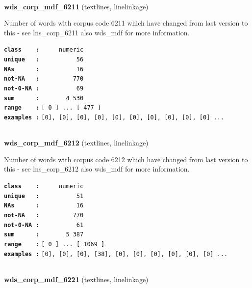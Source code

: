 \documentclass[]{article}
\begin{document}
~

\textbf{wds\_corp\_mdf\_6211} (textlines, linelinkage)

Number of words with corpus code 6211 which have changed from last
version to this - see lns\_corp\_6211 also wds\_mdf for more
information.

\textbf{\texttt{class\ \ \ \ :}} \texttt{~~~~~numeric}\\
\textbf{\texttt{unique\ \ \ :}} \texttt{~~~~~~~~~~56}\\
\textbf{\texttt{NAs\ \ \ \ \ \ :}} \texttt{~~~~~~~~~~16}\\
\textbf{\texttt{not-NA\ \ \ :}} \texttt{~~~~~~~~~770}\\
\textbf{\texttt{not-0-NA\ :}} \texttt{~~~~~~~~~~69}\\
\textbf{\texttt{sum\ \ \ \ \ \ :}} \texttt{~~~~~~~4~530}\\
\textbf{\texttt{range\ \ \ \ :}}
\texttt{{[}\ 0\ {]}\ ...\ {[}\ 477\ {]}}\\
\textbf{\texttt{examples\ :}}
\texttt{{[}0{]},\ {[}0{]},\ {[}0{]},\ {[}0{]},\ {[}0{]},\ {[}0{]},\ {[}0{]},\ {[}0{]},\ {[}0{]},\ {[}0{]}\ ...}\\

~

\textbf{wds\_corp\_mdf\_6212} (textlines, linelinkage)

Number of words with corpus code 6212 which have changed from last
version to this - see lns\_corp\_6212 also wds\_mdf for more
information.

\textbf{\texttt{class\ \ \ \ :}} \texttt{~~~~~numeric}\\
\textbf{\texttt{unique\ \ \ :}} \texttt{~~~~~~~~~~51}\\
\textbf{\texttt{NAs\ \ \ \ \ \ :}} \texttt{~~~~~~~~~~16}\\
\textbf{\texttt{not-NA\ \ \ :}} \texttt{~~~~~~~~~770}\\
\textbf{\texttt{not-0-NA\ :}} \texttt{~~~~~~~~~~61}\\
\textbf{\texttt{sum\ \ \ \ \ \ :}} \texttt{~~~~~~~5~387}\\
\textbf{\texttt{range\ \ \ \ :}}
\texttt{{[}\ 0\ {]}\ ...\ {[}\ 1069\ {]}}\\
\textbf{\texttt{examples\ :}}
\texttt{{[}0{]},\ {[}0{]},\ {[}0{]},\ {[}38{]},\ {[}0{]},\ {[}0{]},\ {[}0{]},\ {[}0{]},\ {[}0{]},\ {[}0{]}\ ...}\\

~

\textbf{wds\_corp\_mdf\_6221} (textlines, linelinkage)
\end{document}
